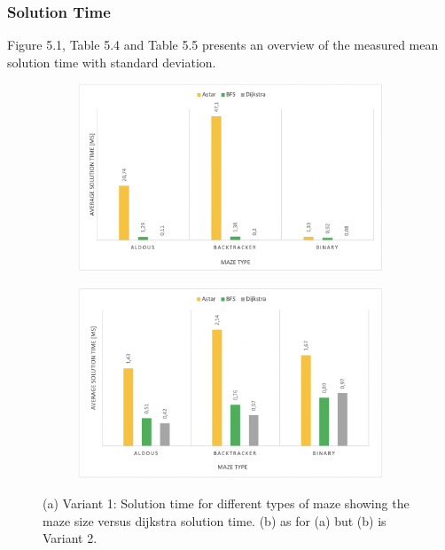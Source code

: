 \subsubsection{Solution Time}
Figure 5.1, Table 5.4 and Table 5.5 presents an overview of the measured mean solution time with standard deviation. 
\begin{figure}[!h]
    \centering
    \begin{subfigure}[b]{0.48\textwidth}
        \centering
        \includegraphics[width=\textwidth]{averagetime_variant1.png}
        \caption{}
    \end{subfigure}
    \begin{subfigure}[b]{0.48\textwidth}  
        \centering 
        \includegraphics[width=\textwidth]{averagetime_variant2.png}
        \caption{}
    \end{subfigure}
    \caption[]{(a) Variant 1: Solution time for different types of maze showing the maze size versus dijkstra solution time. (b) as for (a) but (b) is 
    Variant 2.}
\end{figure}
